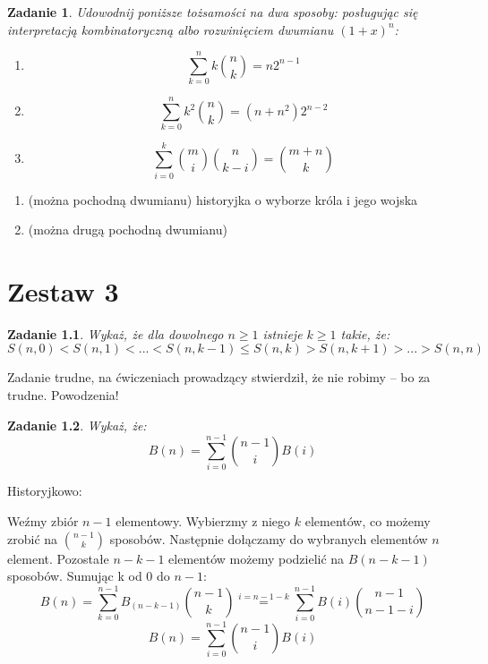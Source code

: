 \documentclass{mwbk}
\newtheorem{zad}{Zadanie}[chapter]
\begin{document}
\begin{zad}
    Udowodnij poniższe tożsamości na dwa sposoby: posługując się interpretacją
    kombinatoryczną albo rozwinięciem dwumianu $(1 + x)^n$:
    \begin{enumerate}
        \item \[\sum_{k=0}^{n}k\binom{n}{k} = n2^{n-1}\]
        \item \[\sum_{k=0}^{n}k^2\binom{n}{k}= (n+n^2)2^{n-2}\]
        \item \[\sum_{i=0}^{k}\binom{m}{i}\binom{n}{k-i} = \binom{m+n}{k} \]
    \end{enumerate}
\end{zad}
\begin{mdframed}
    \begin{enumerate}
        \item (można pochodną dwumianu) historyjka o wyborze króla i jego wojska
        \item (można drugą pochodną dwumianu)
    \end{enumerate}
\end{mdframed}

















\chapter{Zestaw 3}          %

\begin{zad}
    Wykaż, że dla dowolnego $n \geq 1$ istnieje $k \geq 1$ takie, że:
    \[S(n, 0) < S(n, 1) < ... < S(n, k - 1 ) \leq S(n, k) > S(n, k+1) > ... > S(n, n)\]
\end{zad}
\begin{mdframed}
    Zadanie trudne, na ćwiczeniach prowadzący stwierdził, że nie robimy -- bo za trudne.
    Powodzenia!
\end{mdframed}




\begin{zad}
    Wykaż, że:
    \[B(n) = \sum_{i=0}^{n-1} \binom{n-1}{i}B(i)\]
\end{zad}
\begin{mdframed}
    Historyjkowo:

    Weźmy zbiór $n-1$ elementowy. Wybierzmy z niego $k$ elementów, co
    możemy zrobić na $\binom{n-1}{k}$ sposobów. Następnie dołączamy do
    wybranych elementów $n$ element. Pozostałe $n-k-1$ elementów
    możemy podzielić na $B(n-k-1)$ sposobów. Sumując k od $0$ do $n-1$:
    \[B(n) = \sum_{k=0}^{n-1}B_{(n-k-1)}\binom{n-1}{k} \overset{i=n-1-k}{=}
        \sum_{i=0}^{n-1}B(i)\binom{n-1}{n-1-i} \]
    \[B(n) = \sum_{i=0}^{n-1} \binom{n-1}{i}B(i)\]



\end{mdframed}
\end{document}
